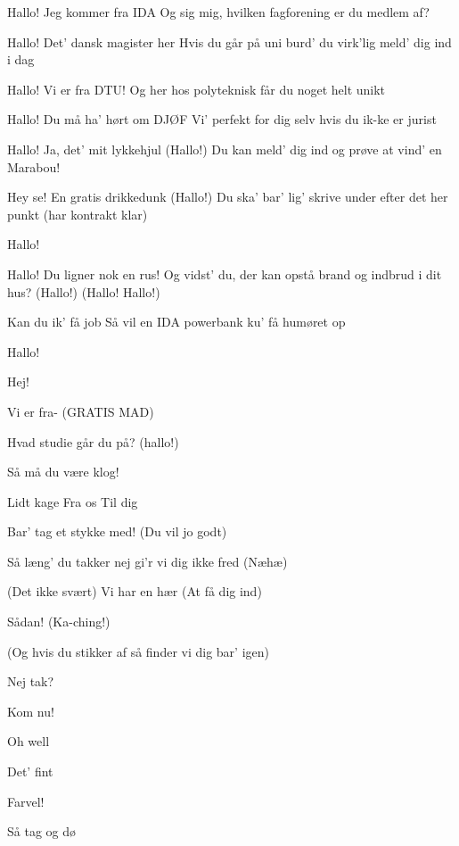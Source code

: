 \documentclass[a4paper,11pt]{article}
\begin{document}
\begin{song}

%
Hallo!
Jeg kommer fra IDA
Og sig mig, hvilken fagforening er du medlem af?

%
Hallo!
Det’ dansk magister her
Hvis du går på uni burd’ du virk’lig meld’ dig ind i dag

%
Hallo!
Vi er fra DTU!
Og her hos polyteknisk får du noget helt unikt

%
Hallo!
Du må ha’ hørt om DJØF
Vi’ perfekt for dig selv hvis du ik-ke er jurist

%
Hallo!
Ja, det’ mit lykkehjul
(Hallo!)
Du kan meld’ dig ind og prøve at vind’ en Marabou!

%
Hey se!
En gratis drikkedunk
(Hallo!)
Du ska’ bar’ lig’ skrive under efter det her punkt (har kontrakt
klar)

%
Hallo!

%
Hallo!
Du ligner nok en rus!
Og vidst’ du, der kan opstå brand og indbrud i dit hus?
(Hallo!)
(Hallo! Hallo!)

%
Kan du ik’ få job
Så vil en IDA powerbank ku’ få humøret op

%
Hallo!

%
Hej!

%
Vi er fra- (GRATIS MAD)

%
Hvad studie går du på?
(hallo!)

%
Så må du være klog!

%
Lidt kage
Fra os
Til dig

%
Bar’ tag et stykke med!
(Du vil jo godt)

%
Så læng’ du takker nej gi’r vi dig ikke fred (Næhæ)

%
(Det ikke svært)
Vi har en hær
(At få dig ind)

%
Sådan! (Ka-ching!)

%
(Og hvis du stikker af så finder vi dig bar’ igen)

%
Nej tak?

%
Kom nu!

%
Oh well

%
Det' fint

%
Farvel!

%
Så tag og dø


\end{song}
\end{document}
